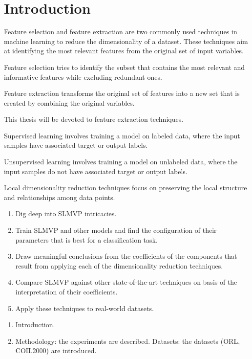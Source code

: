 \chapter{Introduction}

Feature selection and feature extraction are two commonly used techniques in machine learning to reduce the dimensionality of a dataset. These techniques aim at identifying the most relevant features from the original set of input variables.

Feature selection tries to identify the subset that contains the most relevant and informative features while excluding redundant ones.

Feature extraction transforms the original set of features into a new set that is created by combining the original variables.

This thesis will be devoted to feature extraction techniques.

Supervised learning involves training a model on labeled data, where the input samples have associated target or output labels.

Unsupervised learning involves training a model on unlabeled data, where the input samples do not have associated target or output labels.

Local dimensionality reduction techniques focus on preserving the local structure and relationships among data points.


\begin{enumerate}
    \item Dig deep into SLMVP intricacies.
    \item Train SLMVP and other models and find the configuration of their parameters that is best for a classification task.
    \item Draw meaningful conclusions from the coefficients of the components that result from applying each of the dimensionality reduction techniques.
    \item Compare SLMVP against other state-of-the-art techniques on basis of the interpretation of their coefficients.
    \item Apply these techniques to real-world datasets.
\end{enumerate}

\begin{enumerate}
    \item Introduction.
    \item Methodology: the experiments are described.
          \subitem Datasets: the datasets (ORL, COIL2000) are introduced.
\end{enumerate}

